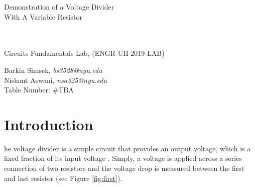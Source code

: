 \documentclass[journal]{IEEEtran}
\begin{document}
\begin{titlepage}
    {\centering
        \vspace*{20em}
        {
        \huge 
        \begin{spacing}{1.5}
            Demonstration of a Voltage Divider \\
            With A Variable Resistor
            
            \\
            \\
            \bigskip
            \large
            Circuits Fundamentals Lab, (ENGR-UH 2019-LAB)
        \end{spacing}

        }
        
    }
    \vfill
    
    {
    \large
    
    \begin{spacing}{1.5}
    \noindent Barkin Simsek, {\it {bs3528@nyu.edu}} 
    \\
    Nishant Aswani, {\it {nsa325@nyu.edu}}
    \\
    Table Number: \#TBA%
    \end{spacing}
    }


\end{titlepage}




%
{}


\begin{abstract}
In this experiment a voltage divider was built using 1K\ohm, 5K\ohm, and 1K\ohm  potentiometer. Different combinations of the resistors were tested on the breadboard and results were recorded.
\end{abstract}


\section{Introduction}
\lowercase{he} voltage divider is a simple circuit that provides an output voltage, which is a fixed fraction of its input voltage \cite[]{hayt1986engineering}. Simply, a voltage is applied across a series connection of two resistors and the voltage drop is measured between the first and last resistor (see Figure \ref{fig:first}).
\end{document}
